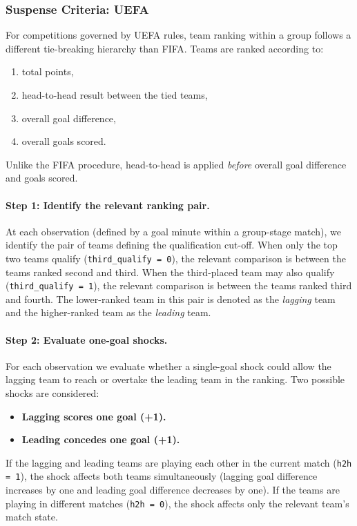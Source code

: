 \documentclass[11pt]{article}
\begin{document}
\subsubsection*{Suspense Criteria: UEFA}
\label{sec:suspense-uefa-implemented} For competitions governed by UEFA rules, team ranking within a group follows a different tie-breaking hierarchy than FIFA. Teams are ranked according to:
\begin{enumerate}
    \item total points,
    \item head-to-head result between the tied teams,
    \item overall goal difference,
    \item overall goals scored.
\end{enumerate}
Unlike the FIFA procedure, head-to-head is applied \emph{before} overall goal difference and goals scored.

\paragraph{Step 1: Identify the relevant ranking pair.}
At each observation (defined by a goal minute within a group-stage match), we identify the pair of teams defining the qualification cut-off. When only the top two teams qualify (\texttt{third\_qualify = 0}), the relevant comparison is between the teams ranked second and third. When the third-placed team may also qualify (\texttt{third\_qualify = 1}), the relevant comparison is between the teams ranked third and fourth. The lower-ranked team in this pair is denoted as the \emph{lagging} team and the higher-ranked team as the \emph{leading} team.

\paragraph{Step 2: Evaluate one-goal shocks.}
For each observation we evaluate whether a single-goal shock could allow the lagging team to reach or overtake the leading team in the ranking. Two possible shocks are considered:
\begin{itemize}
    \item \textbf{Lagging scores one goal (+1).}
    \item \textbf{Leading concedes one goal (+1).}
\end{itemize}

If the lagging and leading teams are playing each other in the current match (\texttt{h2h = 1}), the shock affects both teams simultaneously (lagging goal difference increases by one and leading goal difference decreases by one). If the teams are playing in different matches (\texttt{h2h = 0}), the shock affects only the relevant team's match state.
\end{document}
